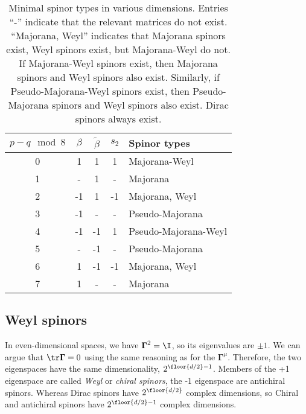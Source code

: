 \documentclass[11pt]{article}
\newcommand{\Gammab}{\boldsymbol{\Gamma}}
\newcommand{\betat}{\tilde{\beta}}
\begin{document}
\begin{table}
  \centering
  \begin{tabular}{ccccl}
  \toprule
    \(p-q \mod 8\) & \(\beta\) & \(\betat\) & \(s_2\) & Spinor types  \\
  \midrule
    0 & 1  & 1  & 1  & Majorana-Weyl        \\
    1 & -  & 1  & -  & Majorana             \\
    2 & -1 & 1  & -1 & Majorana, Weyl       \\
    3 & -1 & -  & -  & Pseudo-Majorana      \\
    4 & -1 & -1 & 1  & Pseudo-Majorana-Weyl \\
    5 & -  & -1 & -  & Pseudo-Majorana      \\
    6 & 1  & -1 & -1 & Majorana, Weyl       \\
    7 & 1  & -  & -  & Majorana             \\
  \bottomrule
  \end{tabular}
  \caption{Minimal spinor types in various dimensions.
  Entries ``-'' indicate that the relevant matrices do not exist.
  ``Majorana, Weyl'' indicates that Majorana spinors exist, Weyl spinors exist, but Majorana-Weyl do not.
  If Majorana-Weyl spinors exist, then Majorana spinors and Weyl spinors also exist.
  Similarly, if Pseudo-Majorana-Weyl spinors exist, then Pseudo-Majorana spinors and Weyl spinors also exist.
  Dirac spinors always exist.
  }\label{tab:types}
\end{table}



\subsection{Weyl spinors}\label{sec:weyl}

In even-dimensional spaces, we have \(\Gammab^2 = \I\), so its eigenvalues are \(\pm 1\).
We can argue that \(\tr \Gammab = 0\) using the same reasoning as for the \(\Gammab^\mu\).
Therefore, the two eigenspaces have the same dimensionality, \(2^{\floor{d/2}-1}\).
Members of the +1 eigenspace are called \emph{Weyl} or \emph{chiral spinors}, the -1 eigenspace are antichiral spinors.
Whereas Dirac spinors have \(2^{\floor{d/2}}\) complex dimensions, so Chiral and antichiral spinors have \(2^{\floor{d/2}-1}\) complex dimensions.
\end{document}
